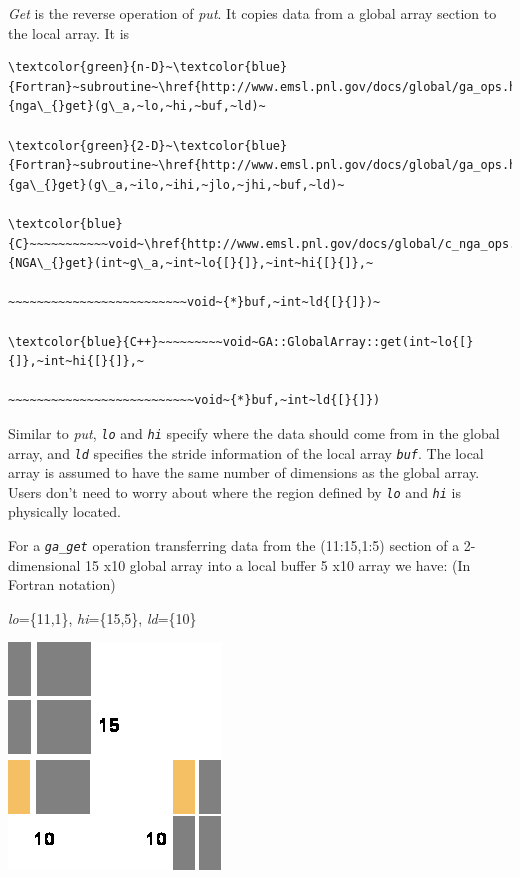 \emph{Get} is the reverse operation of \emph{put}. It copies data
from a global array section to the local array. It is
\begin{verbatim}
\textcolor{green}{n-D}~\textcolor{blue}{Fortran}~subroutine~\href{http://www.emsl.pnl.gov/docs/global/ga_ops.html\#ga_get}{nga\_{}get}(g\_a,~lo,~hi,~buf,~ld)~

\textcolor{green}{2-D}~\textcolor{blue}{Fortran}~subroutine~\href{http://www.emsl.pnl.gov/docs/global/ga_ops.html\#ga_get}{ga\_{}get}(g\_a,~ilo,~ihi,~jlo,~jhi,~buf,~ld)~

\textcolor{blue}{C}~~~~~~~~~~~void~\href{http://www.emsl.pnl.gov/docs/global/c_nga_ops.html\#ga_get}{NGA\_{}get}(int~g\_a,~int~lo{[}{]},~int~hi{[}{]},~

~~~~~~~~~~~~~~~~~~~~~~~~~void~{*}buf,~int~ld{[}{]})~

\textcolor{blue}{C++}~~~~~~~~~void~GA::GlobalArray::get(int~lo{[}{]},~int~hi{[}{]},~

~~~~~~~~~~~~~~~~~~~~~~~~~~void~{*}buf,~int~ld{[}{]})
\end{verbatim}
Similar to \emph{put}, \texttt{\emph{lo}} and \texttt{\emph{hi}} specify
where the data should come from in the global array, and \texttt{\emph{ld}}
specifies the stride information of the local array \texttt{\emph{buf}}.
The local array is assumed to have the same number of dimensions as
the global array. Users don't need to worry about where the region
defined by \texttt{\emph{lo}} and \texttt{\emph{hi}} is physically
located.

\textit{}\textit{\emph{\underbar{:}}}

For a \texttt{\emph{ga\_get}} operation transferring data from the
(11:15,1:5) section of a 2-dimensional 15 x10 global array into a
local buffer 5 x10 array we have: (In Fortran notation)

\begin{center}
\emph{lo}=\{11,1\}, \emph{hi}=\{15,5\}, \emph{ld}=\{10\} 
\par\end{center}

\begin{center}
\includegraphics[width=0.4\columnwidth]{GA_get_example}
\par\end{center}


